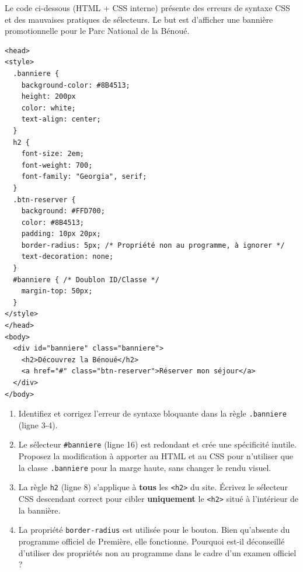 \documentclass[11pt]{article}
\begin{document}
\begin{exercice}
Le code ci-dessous (HTML + CSS interne) présente des erreurs de syntaxe CSS et des mauvaises pratiques de sélecteurs. Le but est d'afficher une bannière promotionnelle pour le Parc National de la Bénoué.
\begin{verbatim}
<head>
<style>
  .banniere { 
    background-color: #8B4513; 
    height: 200px 
    color: white; 
    text-align: center; 
  }
  h2 { 
    font-size: 2em; 
    font-weight: 700; 
    font-family: "Georgia", serif; 
  }
  .btn-reserver { 
    background: #FFD700; 
    color: #8B4513; 
    padding: 10px 20px; 
    border-radius: 5px; /* Propriété non au programme, à ignorer */
    text-decoration: none; 
  }
  #banniere { /* Doublon ID/Classe */
    margin-top: 50px;
  }
</style>
</head>
<body>
  <div id="banniere" class="banniere">
    <h2>Découvrez la Bénoué</h2>
    <a href="#" class="btn-reserver">Réserver mon séjour</a>
  </div>
</body>
\end{verbatim}
\begin{enumerate}
    \item Identifiez et corrigez l'erreur de syntaxe bloquante dans la règle \texttt{.banniere} (ligne 3-4).
    \item Le sélecteur \texttt{\#banniere} (ligne 16) est redondant et crée une spécificité inutile. Proposez la modification à apporter au HTML et au CSS pour n'utiliser que la classe \texttt{.banniere} pour la marge haute, sans changer le rendu visuel.
    \item La règle \texttt{h2} (ligne 8) s'applique à \textbf{tous} les \texttt{<h2>} du site. Écrivez le sélecteur CSS descendant correct pour cibler \textbf{uniquement} le \texttt{<h2>} situé à l'intérieur de la bannière.
    \item La propriété \texttt{border-radius} est utilisée pour le bouton. Bien qu'absente du programme officiel de Première, elle fonctionne. Pourquoi est-il déconseillé d'utiliser des propriétés non au programme dans le cadre d'un examen officiel ?
\end{enumerate}
\end{exercice}
\end{document}
